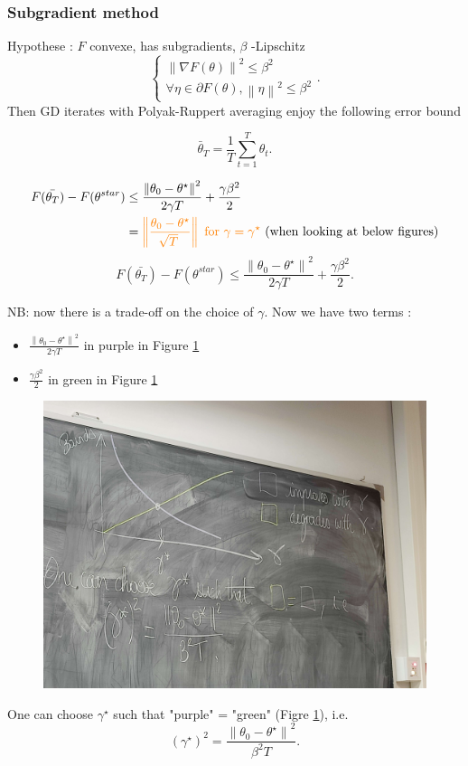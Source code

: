 \subsubsection{Subgradient method}
\begin{thm}
    Hypothese : $ F $ convexe, has subgradients, $ \beta  $ -Lipschitz 
        \[
            \begin{cases}
                \left\| \nabla F(\theta ) \right\| ^2 \leq \beta ^2\\
                \forall \eta \in \partial F(\theta), \left\| \eta  \right\| ^2 \leq \beta ^2
            \end{cases} 
        .\]
    Then GD iterates with Polyak-Ruppert averaging enjoy the following error bound 
    
    \[
        \bar{\theta }_T = \frac{1}{T} \sum_{t=1}^{T} \theta _t
    .\]
    
    \begin{align*}
        F(\bar{\theta_T}) - F(\theta ^{star}) 
            &\leq \frac{\left\| \theta_0 - \theta ^{\star } \right\|^2 }{2 \gamma T} +  \frac{\gamma \beta ^2}{2} \\
            &= \textcolor{orange}{\left\| \frac{\theta _0 - \theta^{\star }}{\sqrt[]{T}} \right\| \text{ for } \gamma = \gamma ^{\star}} 
        \text{ (when looking at below figures)}
    \end{align*}
    \[
        F(\bar{\theta_T}) - F(\theta ^{star}) \leq \frac{\left\| \theta_0 - \theta ^{\star } \right\|^2 }{2 \gamma T} +  \frac{\gamma \beta ^2}{2}     
    .\]
\end{thm}
NB: now there is a trade-off on the choice of $ \gamma  $. Now we have two terms : 
\begin{itemize}
    \item $ \frac{\left\| \theta_0 - \theta ^{\star } \right\|^2 }{2 \gamma T}  $ in purple in Figure \ref*{fig:tradeoff}
    \item $ \frac{\gamma \beta ^2}{2}  $ in green  in Figure \ref*{fig:tradeoff}
\end{itemize}
\begin{figure}[!h]
    \centering
    \includegraphics[width=.75\textwidth]{figs/gamma_compromise.jpg}
    \caption{ }
    \label{fig:tradeoff}
\end{figure}
One can choose $ \gamma ^\star  $ such that "purple" = "green" (Figre \ref*{fig:tradeoff}), i.e. 
\[
    (\gamma ^\star )^2 = \frac{\left\| \theta _0 - \theta ^\star  \right\| ^2}{\beta ^2 T}
.\]

